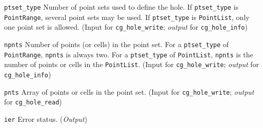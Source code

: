 \begin{Ventryi}{\texttt{ptset\_type}}
      Number of point sets used to define the hole.
      If \texttt{ptset\_type} is \texttt{PointRange}, several point sets
      may be used.
      If \texttt{ptset\_type} is \texttt{PointList}, only one point set
      is allowed.
      (\textcolor{input}{Input} for \texttt{cg\_hole\_write};
      \textcolor{output}{\textit{output}} for \texttt{cg\_hole\_info})
\item [\texttt{npnts}]
      Number of points (or cells) in the point set.
      For a \texttt{ptset\_type} of \texttt{PointRange}, \texttt{npnts}
      is always two.
      For a \texttt{ptset\_type} of \texttt{PointList}, \texttt{npnts} is
      the number of points or cells in the \texttt{PointList}.
      (\textcolor{input}{Input} for \texttt{cg\_hole\_write};
      \textcolor{output}{\textit{output}} for \texttt{cg\_hole\_info})
\item [\texttt{pnts}]
      Array of points or cells in the point set.
      (\textcolor{input}{Input} for \texttt{cg\_hole\_write};
      \textcolor{output}{\textit{output}} for \texttt{cg\_hole\_read})
\item [\texttt{ier}]
      Error status.
      (\textcolor{output}{\textit{Output}})
\end{Ventryi}
